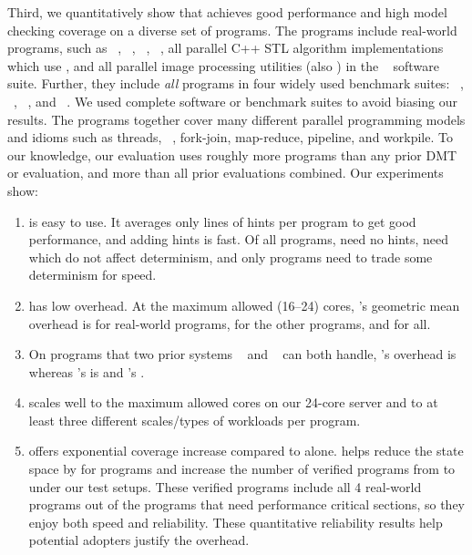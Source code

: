 Third, we quantitatively show that \parrot achieves good performance and high
model checking coverage on a diverse set of \nprog programs.  The programs
include \nrealprog real-world programs, such as \bdb~\cite{berkeleydb},
\openldap~\cite{openldap}, \redis~\cite{redis}, \mplayer~\cite{mplayer},
all \nstl parallel C++ STL algorithm 
implementations~\cite{parallel-stl} which use \openmp, and all \nimagick
parallel image processing utilities (also \openmp) in the
\imagick~\cite{imagick}
software suite.  Further, they
include \emph{all} \nbenchmarks programs in four widely used benchmark suites:
\parsec~\cite{parsec}, \phoenix~\cite{phoenix-benchmarks},
\splashx~\cite{splashx},
and \npb~\cite{npb}.  We used complete software or benchmark suites to
avoid biasing our results. The programs together cover many different
parallel programming models and idioms such as threads,
\openmp~\cite{openmp}, fork-join, map-reduce, pipeline, and workpile.  To
our knowledge, our
evaluation uses roughly \overeach more programs than any prior
DMT or \smt evaluation, and \overcombined more than all
prior evaluations combined.
Our experiments show:
\begin{enumerate}

\item \parrot is easy to use. It averages only \hintsperprog lines of hints
  per program to get good performance, and adding hints is fast.  Of all
  \nprog programs, \nprognohints need no hints, \nproglineuphints need
  \computes which do not affect determinism, and only \nprognondethints
  programs need \nondets to trade some determinism for speed.

\item \parrot has low overhead.  At the maximum allowed (16--24) cores,
\parrot's
  geometric mean overhead is \meanrealoverhead for \nrealprog real-world
programs,
  \meanbenchoverhead for the other \nbenchmarks programs, and \meanoverhead for
all.

\item On \nprogcompared programs that two prior systems
\dthreads~\cite{dthreads:sosp11}
  and \coredet~\cite{coredet:asplos10} can both handle, \parrot's overhead is
\parrotcompoverhead whereas \dthreads's
  is \dthreadssyncoverhead and \coredet's \coredetoverhead.

\item \parrot scales well to the maximum allowed cores on our 24-core server and
  to at least three different scales/types of workloads per program.

\item \ecosys offers exponential coverage increase compared to \dbug alone.
  \parrot helps \dbug reduce the state space by \shrinkscale for
  \nprogshrink programs and increase the number of verified programs from
  \nprogverifieddbug to \nprogverifiedxxx under our test setups.
  These verified programs include all 4 real-world programs out of
  the \nprognondethints programs that need performance critical sections, so
they
  enjoy both speed and reliability.
  These quantitative reliability results help potential \parrot adopters justify
  the overhead.

\end{enumerate}

